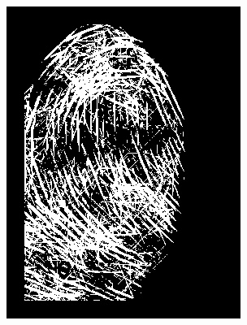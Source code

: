 \documentclass{beamer}
\begin{document}
{\begin{figure}[!ht]
\begin{subfigure}[ht]{0.15\textwidth}
            \includegraphics[width=\textwidth]{fingerprints/2004Db4a/1_2_mask.jpg}
        \end{subfigure}
        \qquad
        \begin{subfigure}[ht]{0.15\textwidth}

\end{subfigure}
\end{figure}}
\end{document}

